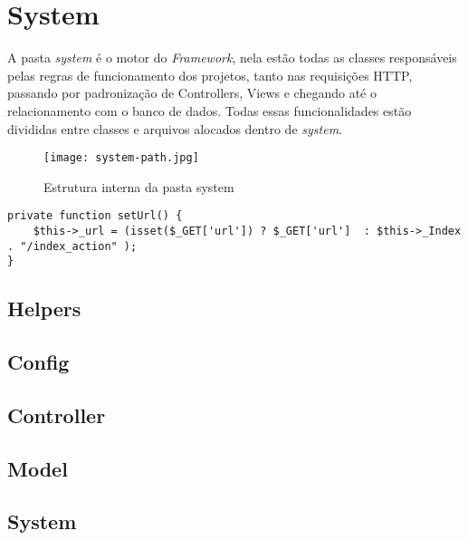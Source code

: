     \section{System\label{sec:system-core}}

        A pasta \emph{system} é o motor do \emph{Framework}, nela estão todas as classes responsáveis pelas regras de funcionamento dos projetos, tanto nas requisições HTTP, passando por padronização de Controllers, Views e chegando até o relacionamento com o banco de dados. Todas essas funcionalidades estão divididas entre classes e arquivos alocados dentro de \emph{system}.

            \begin{figure}[!htb]
                \centering
                \texttt{[image: system-path.jpg]}
                \caption{\small Estrutura interna da pasta system}
                \label{cap:sass}
            \end{figure}




\begin{lstlisting}
private function setUrl() {
    $this->_url = (isset($_GET['url']) ? $_GET['url']  : $this->_Index . "/index_action" );
}
\end{lstlisting}


        \subsection{Helpers\label{sub:system-helper}}

        \subsection{Config\label{sub:system-config}}

        \subsection{Controller\label{sub:system-controller}}

        \subsection{Model\label{sub:system-model}}

        \subsection{System\label{sub:system-system}}

